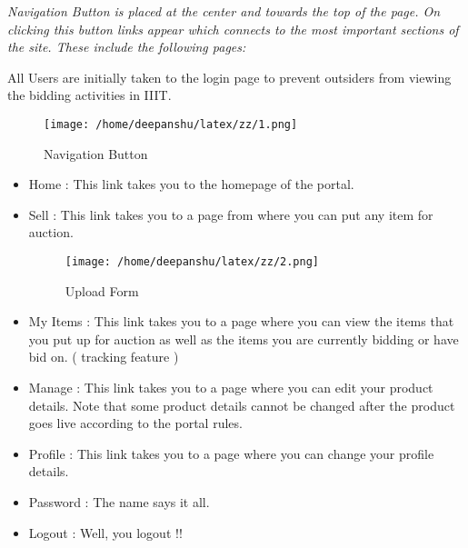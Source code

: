 \documentclass[a4paper,12pt]{article}
\begin{document}
\normalsize \textsl {Navigation Button is placed at the center and towards the top of the page. On clicking this button links appear which connects to the most important sections of the site. These include the following pages:} \\ \vspace{5pt}

\hspace{15pt} All Users are initially taken to the login page to prevent outsiders from viewing the bidding activities in IIIT. \\


\begin{figure}[ht!]
\centering
\texttt{[image: /home/deepanshu/latex/zz/1.png]}
\caption{Navigation Button \label{overflow}}
\end{figure}



\begin{itemize}
 \item {Home} : This link takes you to the homepage of the portal. \\

\item Sell : This link takes you to a page from where you can put any item for auction. \\


\begin{figure}[ht!]
\centering
\texttt{[image: /home/deepanshu/latex/zz/2.png]}
\caption{Upload Form \label{overflow}}
\end{figure} \newpage




\item My Items : This link takes you to a page where you can view the items that you put up for auction as well as the items you are currently bidding or have bid on. ( tracking feature ) \\

\item Manage : This link takes you to a page where you can edit your product details. Note that some product details cannot be changed after the product goes live according to the portal rules.\\

\item Profile : This link takes you to a page where you can change your profile details. \\

\item Password : The name says it all.

\item Logout : Well, you logout !! \\ \vspace{5pt}
\end{itemize}
\end{document}

